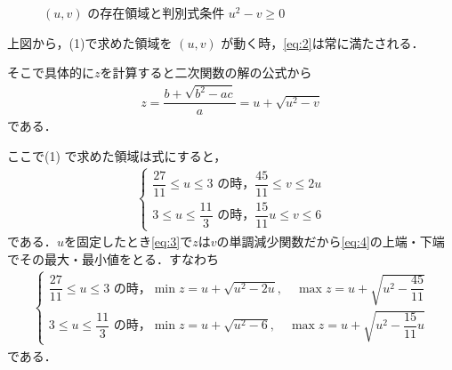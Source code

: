 \documentclass[../../main.tex]{subfiles}
\begin{document}
\begin{figure}[htb]
  \caption{$(u,v)$ の存在領域と判別式条件 $u^2 - v \ge 0$}
  \label{fig:uv_region_and_parabola}
\end{figure}

上図から，(1)で求めた領域を $(u, v)$ が動く時，\cref{eq:2}は常に満たされる．

そこで具体的に$z$を計算すると二次関数の解の公式から
\begin{align}
  z = \dfrac{b + \sqrt{b^2 - ac}}{a} = u + \sqrt{u^2 - v} \label{eq:3}
\end{align}
である．

ここで(1) で求めた領域は式にすると，
\begin{align}
  \begin{cases}
    \dfrac{27}{11} \le u \le 3 \text{ の時，} \dfrac{45}{11} \le v \le 2u \\
    3 \le u \le \dfrac{11}{3} \text{ の時，} \dfrac{15}{11}u \le v \le 6
  \end{cases} \label{eq:4}
\end{align}
である．$u$を固定したとき\cref{eq:3}で$z$は$v$の単調減少関数だから\cref{eq:4}の上端・下端でその最大・最小値をとる．すなわち
\begin{align}
  \begin{cases}
    \dfrac{27}{11} \le u \le 3 \text{ の時，} \min z = u + \sqrt{u^2 - 2u}, \quad \max z = u + \sqrt{u^2 - \dfrac{45}{11}} \\
    3 \le u \le \dfrac{11}{3} \text{ の時，} \min z = u + \sqrt{u^2 - 6}, \quad \max z = u + \sqrt{u^2 - \dfrac{15}{11}u}
  \end{cases} \label{eq:5}
\end{align}
である．
\end{document}
